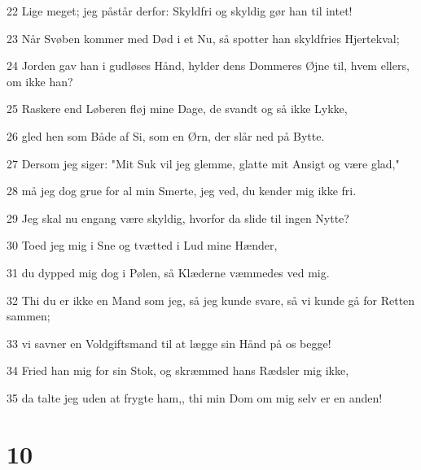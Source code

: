 \par 22 Lige meget; jeg påstår derfor: Skyldfri og skyldig gør han til intet!
\par 23 Når Svøben kommer med Død i et Nu, så spotter han skyldfries Hjertekval;
\par 24 Jorden gav han i gudløses Hånd, hylder dens Dommeres Øjne til, hvem ellers, om ikke han?
\par 25 Raskere end Løberen fløj mine Dage, de svandt og så ikke Lykke,
\par 26 gled hen som Både af Si, som en Ørn, der slår ned på Bytte.
\par 27 Dersom jeg siger: "Mit Suk vil jeg glemme, glatte mit Ansigt og være glad,"
\par 28 må jeg dog grue for al min Smerte, jeg ved, du kender mig ikke fri.
\par 29 Jeg skal nu engang være skyldig, hvorfor da slide til ingen Nytte?
\par 30 Toed jeg mig i Sne og tvætted i Lud mine Hænder,
\par 31 du dypped mig dog i Pølen, så Klæderne væmmedes ved mig.
\par 32 Thi du er ikke en Mand som jeg, så jeg kunde svare, så vi kunde gå for Retten sammen;
\par 33 vi savner en Voldgiftsmand til at lægge sin Hånd på os begge!
\par 34 Fried han mig for sin Stok, og skræmmed hans Rædsler mig ikke,
\par 35 da talte jeg uden at frygte ham,, thi min Dom om mig selv er en anden!

\chapter{10}

